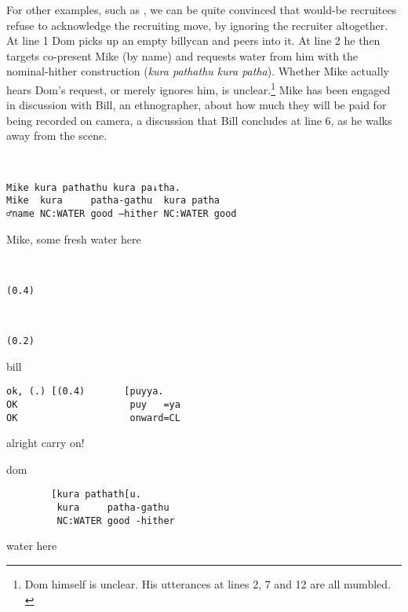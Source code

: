 \documentclass[output=paper,nonflat,colorlinks,citecolor=brown]{langsci/langscibook}
\begin{document}
For other examples, such as , we can be quite convinced that would-be recruitees refuse to acknowledge the recruiting move, by ignoring the recruiter altogether. At line 1 Dom picks up an empty billycan and peers into it. At line 2 he then targets co-present Mike (by name) and requests water from him with the nominal-hither construction (\textit{kura pathathu kura patha}). Whether Mike actually hears Dom’s request, or merely ignores him, is unclear.\footnote{Dom himself is unclear. His utterances at lines 2, 7 and 12 are all mumbled.\\
} Mike has been engaged in discussion with Bill, an ethnographer, about how much they will be paid for being recorded on camera, a discussion that Bill concludes at line 6, as he walks away from the scene.

\vspace{2mm}
%
%
\begin{transbox}{2}{~}
\begin{verbatim}
Mike kura pathathu kura pa↓tha.
Mike  kura     patha-gathu  kura patha
♂name NC:WATER good –hither NC:WATER good
\end{verbatim}
Mike, some fresh water here
\end{transbox}
%
\begin{transbox}{3}{~}
\begin{verbatim}
(0.4)
\end{verbatim}
\end{transbox}
%
%
\begin{transbox}{5}{~}
\begin{verbatim}
(0.2)
\end{verbatim}
\end{transbox}
%
\begin{transbox}{6}{bill}
\begin{verbatim}
ok, (.) [(0.4)       [puyya.
OK                    puy   =ya
OK                    onward=CL
\end{verbatim}
alright \hspace{2.25cm} carry on!
\end{transbox}
%
\begin{transbox}{7}{dom}
\begin{verbatim}
        [kura pathath[u.
         kura     patha-gathu
         NC:WATER good -hither
\end{verbatim}
\hspace{1.25cm} water here
\end{transbox}
\end{document}
